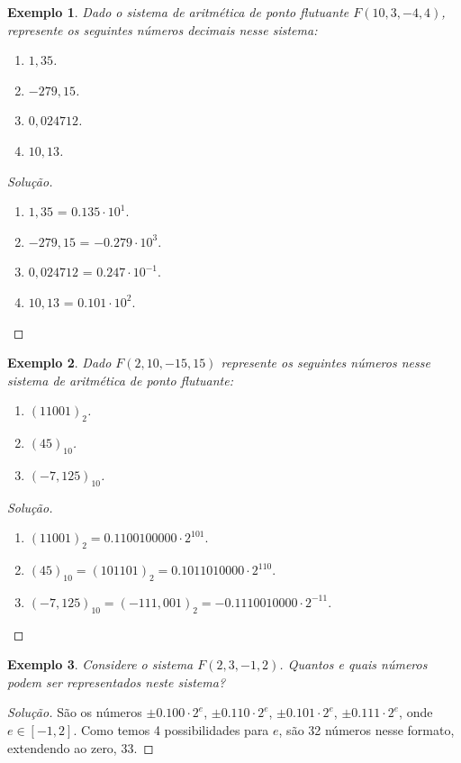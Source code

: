\documentclass[
	12pt,				%
	openright,			%
	twoside,			%
	a4paper,			%
	english,			%
	french,				%
	brazil,				%
	sumario=tradicional
]{abntex2}
\newtheorem{example}{Exemplo}
\newenvironment{solution}{
	\begin{proof}[Solução]
}{\end{proof}}
\numberwithin{example}{chapter}
\numberwithin{remark}{chapter}
\numberwithin{definition}{chapter}
\numberwithin{figure}{chapter}
\begin{document}
\begin{example}
    Dado o sistema de aritmética de ponto flutuante $F(10, 3, -4, 4)$, represente os seguintes números decimais nesse sistema:
    \begin{enumerate}
        \item $1,35$.
        \item $-279,15$.
        \item $0,024712$.
        \item $10,13$.
    \end{enumerate}
\end{example}
\begin{solution}
    \begin{enumerate}
        \item $1,35$ = $0.135\cdot 10^1$.
        \item $-279,15$ = $-0.279\cdot 10^3$.
        \item $0,024712$ = $0.247\cdot 10^{-1}$.
        \item $10,13$ = $0.101\cdot 10^2$.
    \end{enumerate}
\end{solution}

\begin{example}
    Dado $F(2, 10, -15, 15)$ represente os seguintes números nesse sistema de aritmética de ponto flutuante:
    \begin{enumerate}
        \item $(11001)_2$.
        \item $(45)_{10}$.
        \item $(-7,125)_{10}$.
	\end{enumerate}
\end{example}
\begin{solution}\hfill
    \begin{enumerate}
        \item $(11001)_2 = 0.1100100000\cdot 2^{101}$.
        \item $(45)_{10} = (101101)_2 = 0.1011010000\cdot 2^{110}$.
        \item $(-7,125)_{10} = (-111,001)_2 = -0.1110010000\cdot 2^{-11}$.
    \end{enumerate}
\end{solution}

\begin{example}
    Considere o sistema $F(2, 3, -1, 2)$. Quantos e quais números podem ser representados neste sistema?
\end{example}
\begin{solution}
    São os números $\pm 0.100\cdot 2^e$, $\pm 0.110\cdot 2^e$, $\pm 0.101\cdot 2^e$, $\pm 0.111 \cdot 2^e$, onde $e \in [-1, 2]$. Como temos 4 possibilidades para $e$, são 32 números nesse formato, extendendo ao zero, 33.
\end{solution}
\end{document}
